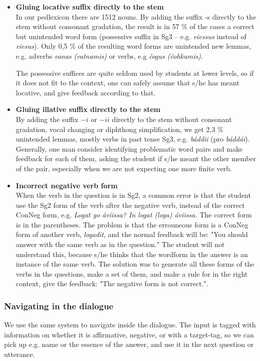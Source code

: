 \documentclass[a4paper,12pt]{article}
\begin{document}
\begin{itemize}

\item \textbf{Gluing locative suffix directly to the stem} \\
In our pedlexicon there are 1512 nouns. By adding the suffix -s directly to the stem without consonant gradation, the result is in 57 \% of the cases a correct but unintended word form (possessive suffix in Sg3 -- e.g. \textit{viessus} instead of \textit{viesus}). Only 0,5 \% of the resulting word forms are unintended new lemmas, e.g. adverbs \textit{eanas  (eatnamis)} or verbs, e.g \textit{čogus (čohkumis)}.

The possessive suffices are quite seldom used by students at lower levels, so if it does not fit to the context, one can safely assume that s/he has meant locative, and give feedback according to that. 

\item \textbf{Gluing illative suffix directly to the stem}\\
By adding the suffix $-i$ or $-ii$ directly to the stem without consonant gradation, vocal changing or diphthong simplification, we get 2,3 \% unintended lemmas, mostly verbs in past tense Sg3, e.g. \textit{báddii}  (pro \textit{báddái}). Generally, one man consider identifying problematic word pairs and make feedback for each of them, asking the student if s/he meant the other member of the pair, especially when we are not expecting one more finite verb.

\item \textbf{Incorrect negative verb form}\\
When the verb in the question is in Sg2, a common error is that the student use the Sg2 form of the verb after the negative verb, instead of the correct ConNeg form, e.g. \textit{Logat go áviissa? In logat (loga) áviissa.} The correct form is in the parentheses. The problem is that the errouneous form is a ConNeg form of another verb, \textit{logadit}, and the normal feedback will be: "You should answer with the same verb as in the question." The student will not understand this, because s/he thinks that the wordform in the answer is an instance of the same verb. The solution was to generate all these forms of the verbs in the questions, make a set of them, and make a rule for in the right context, give the feedback: "The negative form is not correct.". 
\end{itemize}


\subsubsection{Navigating in the dialogue}
We use the same system to navigate inside the dialogue. The input is tagged with information on whether it is affirmative, negative, or with a target-tag, so we can pick up e.g. name or the essence of the answer, and use it in the next question or utterance. 
\end{document}

